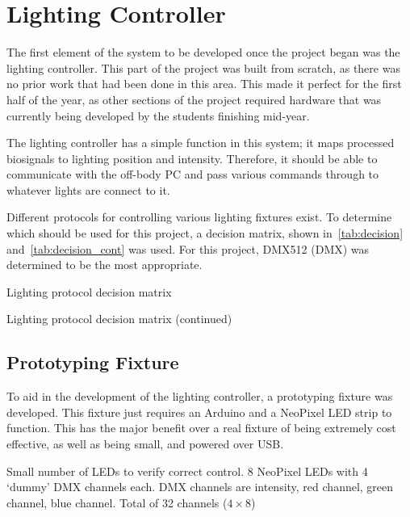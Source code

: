 \chapter{Lighting Controller}
The first element of the system to be developed once the project began was the lighting controller.
This part of the project was built from scratch, as there was no prior work that had been done in this area.
This made it perfect for the first half of the year,
as other sections of the project required hardware that was currently being developed by the students finishing mid-year.

The lighting controller has a simple function in this system; it maps processed biosignals to lighting position and intensity.
Therefore, it should be able to communicate with the off-body PC and pass various commands through to whatever lights are connect to it.

Different protocols for controlling various lighting fixtures exist.
To determine which should be used for this project, a decision matrix, shown in~\autoref{tab:decision} and~\autoref{tab:decision_cont} was used.
For this project, DMX512 (DMX) was determined to be the most appropriate.

\begin{table}[!ht]
    \caption{Lighting protocol decision matrix}\label{tab:decision}
    \centering
    
\end{table}

\begin{table}[!ht]
    \caption{Lighting protocol decision matrix (continued)}\label{tab:decision_cont}
    \centering
    
\end{table}

\section{Prototyping Fixture}
To aid in the development of the lighting controller, a prototyping fixture was developed.
This fixture just requires an Arduino and a NeoPixel LED strip to function.
This has the major benefit over a real fixture of being extremely cost effective, as well as being small, and powered over USB.


Small number of LEDs to verify correct control.
8 NeoPixel LEDs with 4 `dummy' DMX channels each.
DMX channels are intensity, red channel, green channel, blue channel.
Total of 32 channels (\(4 \times 8\))

